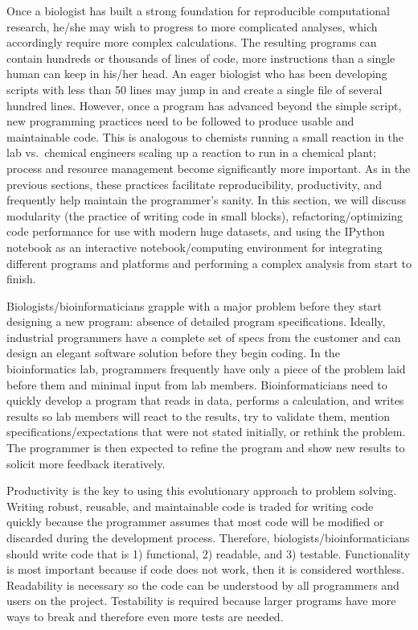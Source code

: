 \documentclass[ChapterTOCs,krantz2]{krantz} %
\begin{document}
Once a biologist has built a strong foundation for reproducible computational
research, he/she may wish to progress to more complicated analyses, which
accordingly require more complex calculations.  The resulting programs can
contain hundreds or thousands of lines of code, more instructions than a single
human can keep in his/her head.  An eager biologist who has been developing 
scripts with less than 50 lines may jump in and create a single file of
several hundred lines.  However, once a program has advanced beyond the
simple script, new programming practices need to be followed to produce usable
and maintainable code.  This is analogous to chemists running a small reaction
in the lab vs.\ chemical engineers scaling up a reaction to run in a chemical
plant; process and resource management become significantly more important.  As in the
previous sections, these practices facilitate reproducibility,
productivity, and frequently help maintain the programmer's sanity.  In this
section, we will discuss modularity (the practice of writing code in small blocks), refactoring/optimizing code performance for use with
modern huge datasets, and using the IPython notebook as an interactive
notebook/computing environment for integrating different programs and platforms
and performing a complex analysis from start to finish.

Biologists/bioinformaticians grapple with a major problem before they start 
designing a new program:
absence of detailed program specifications\cite{Segal2007}.  Ideally, industrial
programmers have a complete set of specs from the customer 
and can design an elegant software solution before they begin
coding.  In the bioinformatics lab, programmers frequently have only a piece of
the problem laid before them and minimal input from lab members.  
Bioinformaticians need to quickly
develop a program that reads in data, performs a calculation, and writes
results so lab members will react to the results, try to validate them, mention
specifications/expectations that were not stated initially, or
rethink the problem.  The programmer is then
expected to refine the program and show new results to
solicit more feedback iteratively. 

Productivity is the key to using this evolutionary approach to problem solving.  
Writing robust, reusable, and maintainable code is traded for
writing code quickly because the programmer assumes that most code will be
modified or discarded during the development process.  Therefore,
biologists/bioinformaticians should write code that is 1) functional, 2)
readable, and 3) testable.  Functionality is most important because if code
does not work, then it is considered worthless\cite{Kelly2008}.
Readability is necessary so the code can be understood by all programmers and users
on the project.  
Testability is required
because larger programs have more ways to break and therefore even more tests
are needed.
\end{document}
